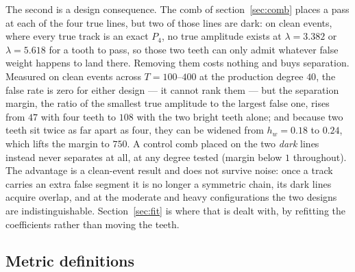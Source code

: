 \documentclass[11pt,a4paper]{article}
\begin{document}
The second is a design consequence. The comb of section~\ref{sec:comb} places a
pass at each of the four true lines, but two of those lines are dark: on clean
events, where every true track is an exact $P_4$, no true amplitude exists at
$\lambda=3.382$ or $\lambda=5.618$ for a tooth to pass, so those two teeth can
only admit whatever false weight happens to land there. Removing them costs
nothing and buys separation. Measured on clean events across $T=100$--$400$ at
the production degree $40$, the false rate is zero for either design --- it
cannot rank them --- but the separation margin, the ratio of the smallest true
amplitude to the largest false one, rises from $47$ with four teeth to $108$
with the two bright teeth alone; and because two teeth sit twice as far apart as
four, they can be widened from $h_w=0.18$ to $0.24$, which lifts the margin to
$750$. A control comb placed on the two \emph{dark} lines instead never
separates at all, at any degree tested (margin below $1$ throughout). The
advantage is a clean-event result and does not survive noise: once a track
carries an extra false segment it is no longer a symmetric chain, its dark lines
acquire overlap, and at the moderate and heavy configurations the two designs
are indistinguishable. Section~\ref{sec:fit} is where that is dealt with, by
refitting the coefficients rather than moving the teeth.

\subsection{Metric definitions}
\label{sec:toy:metrics}
\end{document}
